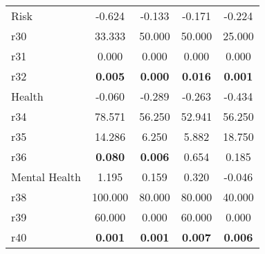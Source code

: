 \begin{tabular}{lcccc}
\midrule
Risk &    -0.624 &    -0.133 &    -0.171 &    -0.224 \\  
r30 &    33.333 &    50.000 &    50.000 &    25.000 \\  
r31 &     0.000 &     0.000 &     0.000 &     0.000 \\  
r32 &     \textbf{0.005} &     \textbf{0.000} &     \textbf{0.016} &     \textbf{0.001} \\  
\midrule
Health &    -0.060 &    -0.289 &    -0.263 &    -0.434 \\  
r34 &    78.571 &    56.250 &    52.941 &    56.250 \\  
r35 &    14.286 &     6.250 &     5.882 &    18.750 \\  
r36 &     \textbf{0.080} &     \textbf{0.006} &     0.654 &     0.185 \\  
\midrule
Mental Health &     1.195 &     0.159 &     0.320 &    -0.046 \\  
r38 &   100.000 &    80.000 &    80.000 &    40.000 \\  
r39 &    60.000 &     0.000 &    60.000 &     0.000 \\  
r40 &     \textbf{0.001} &     \textbf{0.001} &     \textbf{0.007} &     \textbf{0.006} \\  
\bottomrule 
\end{tabular}

